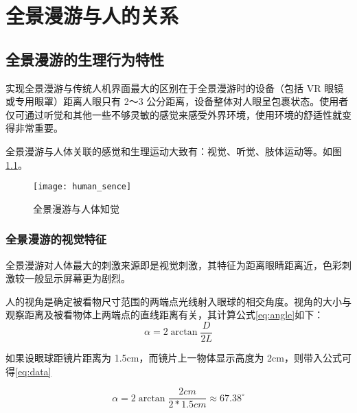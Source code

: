 \chapter{全景漫游与人的关系}

\section{全景漫游的生理行为特性}
实现全景漫游与传统人机界面最大的区别在于全景漫游时的设备（包括 VR 眼镜或专用眼罩）距离人眼只有 2～3 公分距离，设备整体对人眼呈包裹状态。使用者仅可通过听觉和其他一些不够灵敏的感觉来感受外界环境，使用环境的舒适性就变得非常重要。

全景漫游与人体关联的感觉和生理运动大致有：视觉、听觉、肢体运动等。如图\ref{fig:human_sence}。

\begin{figure}[htp]
\centering
\texttt{[image: human\_sence]}
\caption{全景漫游与人体知觉}
\label{fig:human_sence}
\end{figure}

\subsection{全景漫游的视觉特征}
全景漫游对人体最大的刺激来源即是视觉刺激，其特征为距离眼睛距离近，色彩刺激较一般显示屏幕更为剧烈。

人的视角是确定被看物尺寸范围的两端点光线射入眼球的相交角度。视角的大小与观察距离及被看物体上两端点的直线距离有关，其计算公式\ref{eq:angle}如下：
\begin{equation}
\alpha=2\arctan{\frac{D}{2L}}
\label{eq:angle}
\end{equation}

如果设眼球距镜片距离为 1.5cm，而镜片上一物体显示高度为 2cm，则带入公式可得\ref{eq:data}

\begin{equation}
\alpha=2\arctan{\frac{2cm}{2*1.5cm}}\approx 67.38 ^{\circ}
\label{eq:data}
\end{equation}